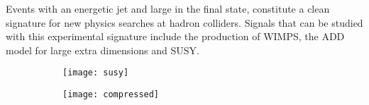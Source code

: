 Events with an energetic jet \pt and large \met in the final state, constitute a
clean signature for new physics searches at hadron colliders. Signals that can
be studied with this experimental signature include the production of WIMPS,
the ADD model for large extra dimensions and SUSY.
\begin{figure}[!h]
  \centering
  \begin{subfigure}[t]{.48\linewidth}
    \texttt{[image: susy]}
    \caption{}
    \label{fig:susy}
  \end{subfigure}
  \begin{subfigure}[t]{.48\linewidth}
    \texttt{[image: compressed]}
    \caption{}
    \label{fig:compressed}
  \end{subfigure}
  \caption{}
  \label{fig:motivation}
\end{figure}
